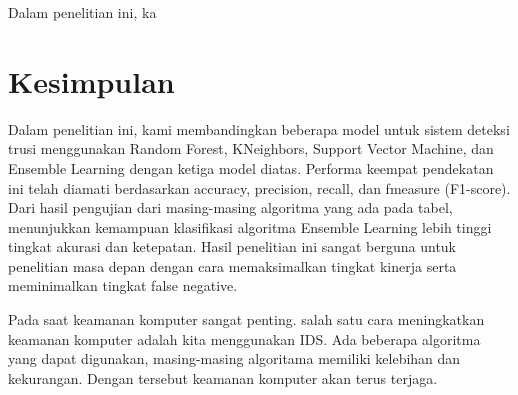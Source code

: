 \documentclass[conference]{IEEEtran}
\begin{document}
Dalam penelitian ini, ka

\section{Kesimpulan}

Dalam penelitian ini, kami membandingkan beberapa model
untuk sistem deteksi trusi menggunakan Random Forest, KNeighbors, Support Vector Machine, dan Ensemble Learning
dengan ketiga model diatas. Performa keempat pendekatan ini
telah diamati berdasarkan accuracy, precision, recall, dan fmeasure (F1-score).
Dari hasil pengujian dari masing-masing algoritma yang
ada pada tabel, menunjukkan kemampuan klasifikasi algoritma
Ensemble Learning lebih tinggi tingkat akurasi dan ketepatan.
Hasil penelitian ini sangat berguna untuk penelitian masa
depan dengan cara memaksimalkan tingkat kinerja serta meminimalkan tingkat false negative.

Pada saat keamanan komputer sangat penting. salah satu
cara meningkatkan keamanan komputer adalah kita menggunakan IDS. Ada beberapa algoritma yang dapat digunakan,
masing-masing algoritama memiliki kelebihan dan kekurangan. Dengan tersebut keamanan komputer akan terus terjaga.



\end{document}
